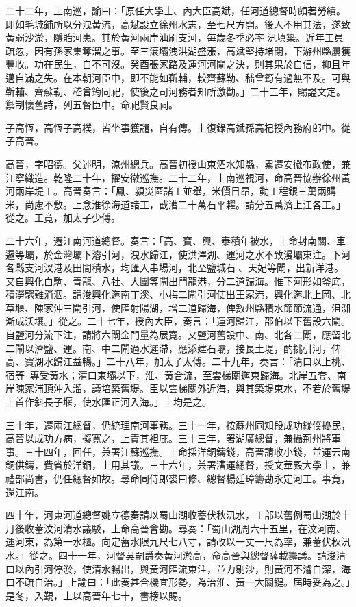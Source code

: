 \begin{pinyinscope}
二十二年，上南巡，諭曰：「原任大學士、內大臣高斌，任河道總督時頗著勞績。即如毛城鋪所以分洩黃流，高斌設立徐州水志，至七尺方開。後人不用其法，遂致黃弱沙淤，隱貽河患。其於黃河兩岸汕刷支河，每歲冬季必率汛填築。近年工員疏忽，因有孫家集奪溜之事。至三滾壩洩洪湖盛漲，高斌堅持堵閉，下游州縣屢獲豐收。功在民生，自不可沒。癸酉張家路及運河河閘之決，則其果於自信，抑且年邁自滿之失。在本朝河臣中，即不能如靳輔，較齊蘇勒、嵇曾筠有過無不及。可與靳輔、齊蘇勒、嵇曾筠同祀，使後之司河務者知所激勸。」二十三年，賜謚文定。禦制懷舊詩，列五督臣中。命祀賢良祠。

子高恆，高恆子高樸，皆坐事獲譴，自有傳。上復錄高斌孫高杞授內務府郎中。從子高晉。

高晉，字昭德。父述明，涼州總兵。高晉初授山東泗水知縣，累遷安徽布政使，兼江寧織造。乾隆二十年，擢安徽巡撫。二十二年，上南巡視河，命高晉協辦徐州黃河兩岸堤工。高晉奏言：「鳳、潁災區諸工並舉，米價日昂，動工程銀三萬兩購米，尚慮不敷。上念淮徐海道諸工，截漕二十萬石平糶。請分五萬濟上江各工。」從之。工竟，加太子少傅。

二十六年，遷江南河道總督。奏言：「高、寶、興、泰積年被水，上命封南關、車邏等壩，於金灣壩下濬引河，洩水歸江，使洪澤湖、運河之水不致漫壩東注。下河各縣支河汊港及田間積水，均匯入串場河，北至鹽城石、天妃等閘，出新洋港。又自興化白駒、青龍、八社、大團等閘出鬥龍港，分二道歸海。惟下河形如釜底，積澇驟難消涸。請浚興化迤南丁溪、小梅二閘引河使出王家港，興化迤北上岡、北草堰、陳家沖三閘引河，使匯射陽湖，增二道歸海，俾數州縣積水節節流通，沮洳漸成沃壤。」從之。二十七年，授內大臣，奏言：「運河歸江，邵伯以下舊設六閘。自鹽河分流下注，請將六閘金門量為展寬。又鹽河舊設中、南、北各二閘，應留北二閘以濟鹽、運。南、中二閘過水遲滯，應添建石壩，接長土堤，酌挑引河，俾高、寶湖水歸江益暢。」二十八年，加太子太傅。二十九年，奏言：「清口以上桃、宿等，專受黃水；清口東壩以下，淮、黃合流，至雲梯關迤東歸海。北岸五套、南岸陳家浦頂沖入溜，議培築舊堤。臣以雲梯關外近海，與其築堤束水，不若於舊堤上首作斜長子堰，使水匯正河入海。」上均是之。

三十年，遷兩江總督，仍統理南河事務。三十一年，按蘇州同知段成功縱僕擾民，高晉以成功方病，擬寬之，上責其袒庇。三十三年，署湖廣總督，兼攝荊州將軍事。三十四年，回任，兼署江蘇巡撫。上命採洋銅鑄錢，高晉請收小錢，並運云南銅供鑄，費省於洋銅，上用其議。三十六年，兼署漕運總督，授文華殿大學士，兼禮部尚書，仍任總督如故。尋命同侍郎裘曰修、總督楊廷璋籌勘永定河工。事竟，還江南。

四十年，河東河道總督姚立德奏請以蜀山湖收蓄伏秋汛水，工部以舊例蜀山湖於十月後收蓄汶河清水議駁，上命高晉會勘。尋奏：「蜀山湖周六十五里，在汶河南、運河東，為第一水櫃。向定蓄水限九尺七八寸，請改以一丈一尺為率，兼蓄伏秋汛水。」從之。四十一年，河督吳嗣爵奏黃河淤高，命高晉與總督薩載籌議。請浚清口以內引河停淤，使清水暢出，與黃河匯流東注，並力剔沙，則黃河不濬自深，海口不疏自治。」上諭曰：「此奏甚合機宜形勢，為治淮、黃一大關鍵。屆時妥為之。」是冬，入覲，上以高晉年七十，書榜以賜。


\end{pinyinscope}
